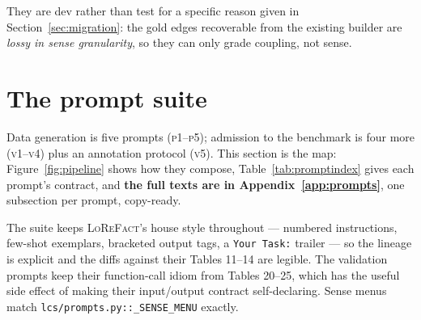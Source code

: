 \documentclass[11pt]{article}
\begin{document}
They are dev rather than test for a specific reason given in Section~\ref{sec:migration}: the
gold edges recoverable from the existing builder are \emph{lossy in sense granularity}, so they
can only grade coupling, not sense.

\section{The prompt suite}
\label{sec:prompts}

Data generation is five prompts (\textsc{p1}--\textsc{p5}); admission to the benchmark is four
more (\textsc{v1}--\textsc{v4}) plus an annotation protocol (\textsc{v5}). This section is the
map: Figure~\ref{fig:pipeline} shows how they compose, Table~\ref{tab:promptindex} gives each
prompt's contract, and \textbf{the full texts are in Appendix~\ref{app:prompts}}, one
subsection per prompt, copy-ready.

The suite keeps \textsc{LoReFact}'s house style throughout --- numbered instructions, few-shot
exemplars, bracketed output tags, a \texttt{Your Task:} trailer --- so the lineage is explicit
and the diffs against their Tables 11--14 are legible. The validation prompts keep their
function-call idiom from Tables 20--25, which has the useful side effect of making their
input/output contract self-declaring. Sense menus match
\texttt{lcs/prompts.py::\_SENSE\_MENU} exactly.
\end{document}
